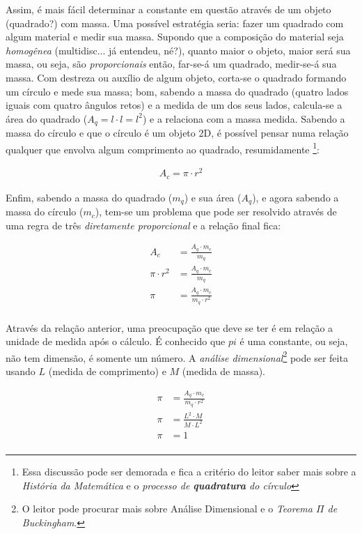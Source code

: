 Assim, é mais fácil determinar a constante em questão através de um objeto (quadrado?) com massa. Uma possível estratégia seria: fazer um quadrado com algum material e medir sua massa. Supondo que a composição do material seja \textit{homogênea} (multidisc... já entendeu, né?), quanto maior o objeto, maior será sua massa, ou seja, são \textit{proporcionais} então, far-se-á um quadrado, medir-se-á sua massa. Com destreza ou auxílio de algum objeto, corta-se o quadrado formando um círculo e mede sua massa; bom, sabendo a massa do quadrado (quatro lados iguais com quatro ângulos retos) e a medida de um dos seus lados, calcula-se a área do quadrado ($A_q=l \cdot l=l^2$) e a relaciona com a massa medida. Sabendo a massa do círculo e que o círculo é um objeto 2D, é possível pensar numa relação qualquer que envolva algum comprimento ao quadrado, resumidamente \footnote{Essa discussão pode ser demorada e fica a critério do leitor saber mais sobre a \textit{História da Matemática} e o \textit{processo de \textbf{quadratura} do círculo}}:

\begin{ceqn}
	\begin{align*}
	A_c = \pi \cdot r^2
	\end{align*}
\end{ceqn}

Enfim, sabendo a massa do quadrado ($m_q$) e sua área ($A_q$), e agora sabendo a massa do círculo ($m_c$), tem-se um problema que pode ser resolvido através de uma regra de três \textit{diretamente proporcional} e a relação final fica:

\begin{ceqn}
	\begin{align*}
	A_c &= \frac{A_q \cdot m_c}{m_q} \\
	\pi \cdot r^2 &= \frac{A_q \cdot m_c}{m_q} \\
	\pi &= \frac{A_q \cdot m_c}{m_q \cdot r^2} \\
	\end{align*}
\end{ceqn}

Através da relação anterior, uma preocupação que deve se ter é em relação a unidade de medida após o cálculo. É conhecido que $pi$ é uma constante, ou seja, não tem dimensão, é somente um número. A \textit{análise dimensional}\footnote{O leitor pode procurar mais sobre Análise Dimensional e o \textit{Teorema $\Pi$ de Buckingham}.} pode ser feita usando $L$ (medida de comprimento) e $M$ (medida de massa).

\begin{ceqn}
	\begin{align*}
	\pi &= \frac{A_q \cdot m_c}{m_q \cdot r^2} \\
	\pi &= \frac{L^2 \cdot M}{M \cdot L^2} \\
	\pi &= 1 \\
	\end{align*}
\end{ceqn}

